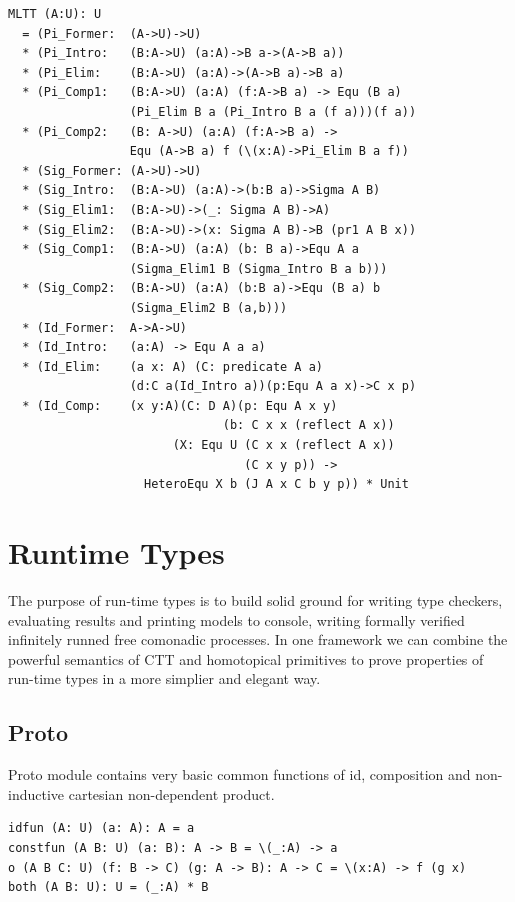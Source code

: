 \documentclass{article}
\begin{document}
\begin{lstlisting}[mathescape=true]
MLTT (A:U): U
  = (Pi_Former:  (A->U)->U)
  * (Pi_Intro:   (B:A->U) (a:A)->B a->(A->B a))
  * (Pi_Elim:    (B:A->U) (a:A)->(A->B a)->B a)
  * (Pi_Comp1:   (B:A->U) (a:A) (f:A->B a) -> Equ (B a)
                 (Pi_Elim B a (Pi_Intro B a (f a)))(f a))
  * (Pi_Comp2:   (B: A->U) (a:A) (f:A->B a) ->
                 Equ (A->B a) f (\(x:A)->Pi_Elim B a f))
  * (Sig_Former: (A->U)->U)
  * (Sig_Intro:  (B:A->U) (a:A)->(b:B a)->Sigma A B)
  * (Sig_Elim1:  (B:A->U)->(_: Sigma A B)->A)
  * (Sig_Elim2:  (B:A->U)->(x: Sigma A B)->B (pr1 A B x))
  * (Sig_Comp1:  (B:A->U) (a:A) (b: B a)->Equ A a
                 (Sigma_Elim1 B (Sigma_Intro B a b)))
  * (Sig_Comp2:  (B:A->U) (a:A) (b:B a)->Equ (B a) b
                 (Sigma_Elim2 B (a,b)))
  * (Id_Former:  A->A->U)
  * (Id_Intro:   (a:A) -> Equ A a a)
  * (Id_Elim:    (a x: A) (C: predicate A a)
                 (d:C a(Id_Intro a))(p:Equ A a x)->C x p)
  * (Id_Comp:    (x y:A)(C: D A)(p: Equ A x y)
                              (b: C x x (reflect A x))
                       (X: Equ U (C x x (reflect A x))
                                 (C x y p)) ->
                   HeteroEqu X b (J A x C b y p)) * Unit
\end{lstlisting}

\newpage
\section{Runtime Types}

The purpose of run-time types is to build solid ground for
writing type checkers, evaluating results and printing models to console,
writing formally verified infinitely runned free comonadic processes.
In one framework we can combine the powerful semantics of CTT and
homotopical primitives to prove properties of run-time types in
a more simplier and elegant way.

\subsection{Proto}

Proto module contains very basic common functions of id, composition and
non-inductive cartesian non-dependent product.

\begin{lstlisting}[mathescape=true]
idfun (A: U) (a: A): A = a
constfun (A B: U) (a: B): A -> B = \(_:A) -> a
o (A B C: U) (f: B -> C) (g: A -> B): A -> C = \(x:A) -> f (g x)
both (A B: U): U = (_:A) * B
\end{lstlisting}
\end{document}
